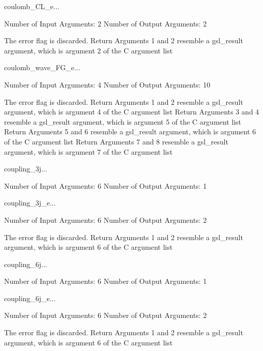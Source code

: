 \begin{funcdesc}{coulomb_CL_e}{...}

    Number of Input  Arguments:  2
    Number of Output Arguments:  2

The error flag is discarded.
Return Arguments 1 and 2 resemble a gsl_result argument,
	which is  argument 2 of the C argument list

\end{funcdesc}

\begin{funcdesc}{coulomb_wave_FG_e}{...}

    Number of Input  Arguments:  4
    Number of Output Arguments: 10

The error flag is discarded.
Return Arguments 1 and 2 resemble a gsl_result argument,
	which is  argument 4 of the C argument list
Return Arguments 3 and 4 resemble a gsl_result argument,
	which is  argument 5 of the C argument list
Return Arguments 5 and 6 resemble a gsl_result argument,
	which is  argument 6 of the C argument list
Return Arguments 7 and 8 resemble a gsl_result argument,
	which is  argument 7 of the C argument list

\end{funcdesc}

\begin{funcdesc}{coupling_3j}{...}

    Number of Input  Arguments:  6
    Number of Output Arguments:  1
\end{funcdesc}

\begin{funcdesc}{coupling_3j_e}{...}

    Number of Input  Arguments:  6
    Number of Output Arguments:  2

The error flag is discarded.
Return Arguments 1 and 2 resemble a gsl_result argument,
	which is  argument 6 of the C argument list

\end{funcdesc}

\begin{funcdesc}{coupling_6j}{...}

    Number of Input  Arguments:  6
    Number of Output Arguments:  1
\end{funcdesc}

\begin{funcdesc}{coupling_6j_e}{...}

    Number of Input  Arguments:  6
    Number of Output Arguments:  2

The error flag is discarded.
Return Arguments 1 and 2 resemble a gsl_result argument,
	which is  argument 6 of the C argument list

\end{funcdesc}

